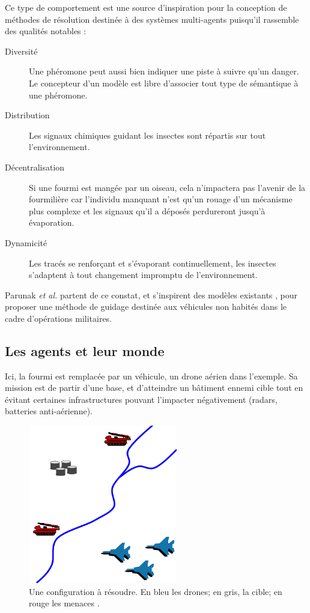 \documentclass[12pt]{article}
\begin{document}
Ce type de comportement est une source d'inspiration pour la
conception de méthodes de résolution destinée à des systèmes
multi-agents puisqu'il rassemble des qualités notables \cite{parunak}
:

\begin{description}
\item[Diversité]{Une phéromone peut aussi bien indiquer une piste à
  suivre qu'un danger. Le concepteur d'un modèle est libre d'associer
  tout type de sémantique à une phéromone.}
\item[Distribution]{Les signaux chimiques guidant les insectes sont
  répartis sur tout l'environnement.}
\item[Décentralisation]{Si une fourmi est mangée par un oiseau, cela
  n'impactera pas l'avenir de la fourmilière car l'individu manquant
  n'est qu'un rouage d'un mécanisme plus complexe et les signaux qu'il
  a déposés perdureront jusqu'à évaporation.}
\item[Dynamicité]{Les tracés se renforçant et s'évaporant
  continuellement, les insectes s'adaptent à tout changement impromptu
  de l'environnement.}
\end{description}

Parunak \textit{et al.} partent de ce constat, et s'inspirent des
modèles existants \cite{dorigo}, pour proposer une méthode de guidage
destinée aux véhicules non habités dans le cadre d'opérations
militaires.

\subsection{Les agents et leur monde}

Ici, la fourmi est remplacée par un véhicule, un drone aérien dans
l'exemple. Sa mission est de partir d'une base, et d'atteindre un
bâtiment ennemi cible tout en évitant certaines infrastructures
pouvant l'impacter négativement (radars, batteries anti-aérienne).

\begin{figure}[H]
  \centering

  \includegraphics[width=6.5cm]{terrain_real.png}

  \caption{Une configuration à résoudre. En bleu les drones; en gris,
    la cible; en rouge les menaces \cite{parunak}.}
  \label{real}
\end{figure}
\end{document}
